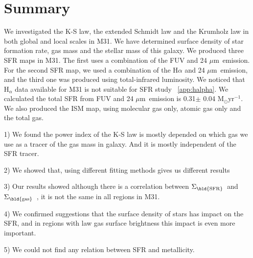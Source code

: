 \documentclass[useAMS,usenatbib]{mn2e}
\newcommand \sigmagas    {$\Sigma_{\rm \bld {gas }} $\ }
\newcommand \sigmasfr     {$\Sigma_{\rm \bld {SFR }} $\ }
\newcommand \um    {$\mu$m\ }
\begin{document}
\section{Summary}
 We investigated the K-S law, the extended Schmidt law and the Krumholz law in both global and local scales in M31. We have determined surface density of star formation rate, gas mass and the stellar mass of this galaxy. We produced three SFR maps in M31. The first uses a combination of the FUV and 24 \um emission. For the second SFR map, we used a combination of the H$\alpha$ and 24 \um emission, and the third one was produced using total-infrared luminosity. We noticed that H$_\alpha$ data available for M31 is not suitable for SFR study ~\ref{app:halpha}. We calculated the total SFR from FUV and 24 \um emission is 0.31$\pm$ 0.04 M$_{\odot}$yr$^{-1}$. We also produced the ISM map, using molecular gas only, atomic gas only and the total gas.

1) We found the power index of the K-S law is mostly depended on which gas we use as a tracer of the gas mass in galaxy. And it is mostly independent of the SFR tracer.

2) We showed that, using different fitting methods gives us different results

3) Our results showed although there is a correlation between \sigmasfr and \sigmagas, it is not the same in all regions in M31. 

4) We confirmed \cite{Shi11} suggestions that the surface density of stars has impact on the SFR, and in regions with law gas surface brightness this impact is even more important. 

5) We could not find any relation between SFR and metallicity.
\end{document}
